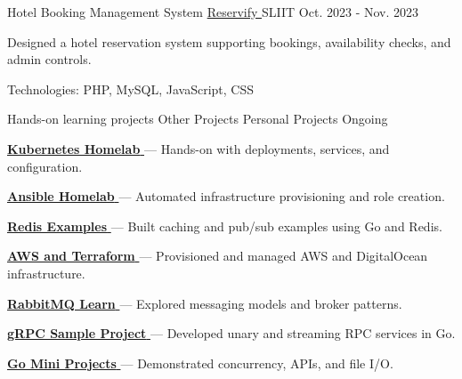 \begin{cventries}
  \cventry
    {Hotel Booking Management System}
    {\href{https://github.com/nmdra/Reservify}{Reservify \faGithub}}
    {SLIIT}
    {Oct. 2023 - Nov. 2023}
    {
      \begin{cvitems}
        \item {Designed a hotel reservation system supporting bookings, availability checks, and admin controls.}
        \item {Technologies: PHP, MySQL, JavaScript, CSS}
      \end{cvitems}
    }

  \cventry
    {Hands-on learning projects}
    {Other Projects}
    {Personal Projects}
    {Ongoing}
    {
      \begin{cvitems}
        \item {\href{https://github.com/nmdra/K8s-Learn}{\textbf{Kubernetes Homelab} \faGithub} — Hands-on with deployments, services, and configuration.}
        \item {\href{https://github.com/nmdra/Ansible-Learn}{\textbf{Ansible Homelab} \faGithub} — Automated infrastructure provisioning and role creation.}
        \item {\href{https://github.com/nmdra/Redis-Learn}{\textbf{Redis Examples} \faGithub} — Built caching and pub/sub examples using Go and Redis.}
        \item {\href{https://github.com/nmdra/Terraform-Learn}{\textbf{AWS and Terraform} \faGithub} — Provisioned and managed AWS and DigitalOcean infrastructure.}
        \item {\href{https://github.com/nmdra/RabbitMQ-Learn}{\textbf{RabbitMQ Learn} \faGithub} — Explored messaging models and broker patterns.}
        \item {\href{https://github.com/nmdra/gRPC-Learn}{\textbf{gRPC Sample Project} \faGithub} — Developed unary and streaming RPC services in Go.}
        \item {\href{https://github.com/nmdra/Go-Mini-Projects}{\textbf{Go Mini Projects} \faGithub} — Demonstrated concurrency, APIs, and file I/O.}
      \end{cvitems}
    }

\end{cventries}
